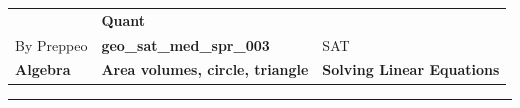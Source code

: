 \documentclass[11pt,paper=a4,answers]{exam}
\begin{document}
\begin{center}
    \centering
    \renewcommand{\arraystretch}{1.5}
    \begin{tabularx}{\textwidth}{YYY}
    & \normalsize\bf{{\Large{{Quant}}}} & \\
    By Preppeo & \normalsize\bf{{geo\_sat\_med\_spr\_003}} & SAT\\
    \normalsize{{\textbf{{Algebra}} }} & \normalsize{{\textbf{{Area volumes, circle, triangle }} }} & \normalsize{{\textbf{{Solving Linear Equations}} }} \\
    \end{tabularx}
\end{center}
\par\noindent\rule{\textwidth}{1pt}
\end{document}
